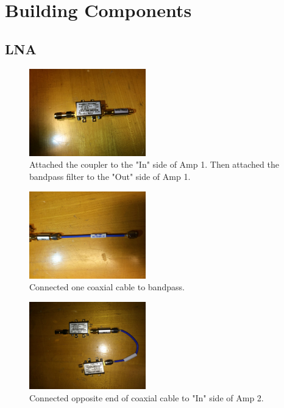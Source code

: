 \documentclass[11pt]{article} %
\begin{document}
\newpage
\section{Building Components}


\subsection{LNA}

\begin{figure}
  \centering
  \caption{Attached the coupler to the "In" side of Amp 1. Then attached the bandpass filter to the "Out" side of Amp 1. }
  \includegraphics[width=0.45\textwidth]{lna/01.jpeg}
\end{figure}


\begin{figure}
  \centering
  \caption{Connected one coaxial cable to bandpass. }
  \includegraphics[width=0.45\textwidth]{lna/02.jpeg}
\end{figure}


\begin{figure}
  \centering
  \caption{Connected opposite end of coaxial cable to "In" side of Amp 2.  }
  \includegraphics[width=0.45\textwidth]{lna/03.jpeg}
\end{figure}
\end{document}
